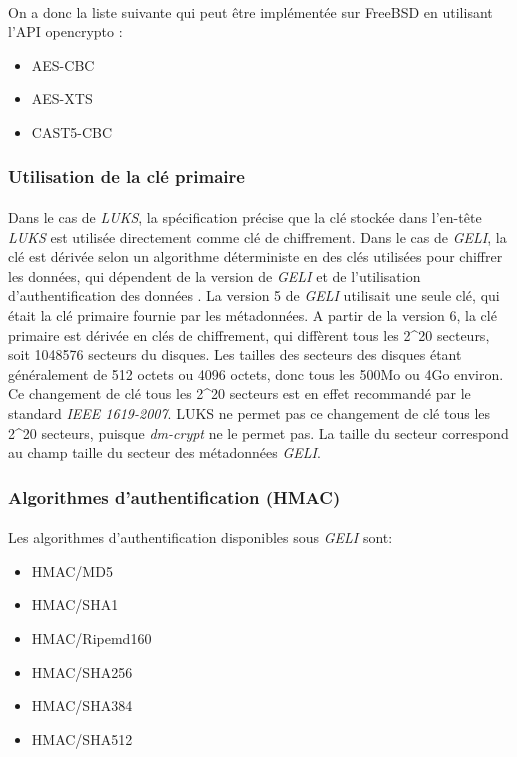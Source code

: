 \paragraph{}
On a donc la liste suivante qui peut être implémentée sur FreeBSD en utilisant 
l'API opencrypto :
\begin{itemize}
	\item{AES-CBC}
	\item{AES-XTS}
	\item{CAST5-CBC}
\end{itemize}


\subsubsection{Utilisation de la clé primaire}
\paragraph{}
Dans le cas de {\em LUKS}, la spécification \cite{onDiskFormatLuks} précise 
que la clé stockée dans l'en-tête {\em LUKS} est utilisée directement comme 
clé de chiffrement. Dans le cas de {\em GELI}, la clé est dérivée selon un 
algorithme déterministe en des clés utilisées pour chiffrer les données, 
qui dépendent de la version de {\em GELI} et de l'utilisation 
d'authentification des données \cite{manGeli}. 
La version 5 de {\em GELI} utilisait une seule clé, qui était la clé
primaire fournie par les métadonnées. A partir de la version 6, la clé primaire
est dérivée en clés de chiffrement, qui diffèrent tous les 2\textasciicircum20 
secteurs, soit 1048576 secteurs du disques. Les tailles des secteurs des 
disques étant généralement de 512 octets ou 4096 octets, 
donc tous les 500Mo ou 4Go environ. Ce changement de clé tous les
2\textasciicircum20 secteurs est en effet recommandé par le standard {\em IEEE 1619-2007}.
LUKS ne permet pas ce changement de clé tous les 2\textasciicircum20 secteurs,
puisque {\em dm-crypt} ne le permet pas.
La taille du secteur correspond au champ taille du secteur des métadonnées
{\em GELI}.

\subsubsection{Algorithmes d'authentification (HMAC)}
\paragraph{}
Les algorithmes d'authentification disponibles sous {\em GELI} sont:
\begin{itemize}
	\item HMAC/MD5
	\item HMAC/SHA1
	\item HMAC/Ripemd160
	\item HMAC/SHA256
	\item HMAC/SHA384
	\item HMAC/SHA512
\end{itemize}


